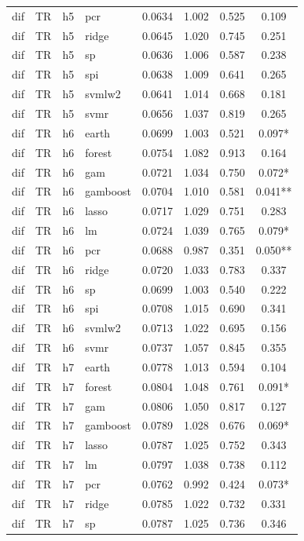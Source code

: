 \begin{ThreePartTable}
\begin{longtable}[t]{llclcccc}
dif & TR & h5 & pcr & 0.0634 & 1.002 & 0.525 & 0.109\\
dif & TR & h5 & ridge & 0.0645 & 1.020 & 0.745 & 0.251\\
dif & TR & h5 & sp & 0.0636 & 1.006 & 0.587 & 0.238\\
dif & TR & h5 & spi & 0.0638 & 1.009 & 0.641 & 0.265\\
dif & TR & h5 & svmlw2 & 0.0641 & 1.014 & 0.668 & 0.181\\
dif & TR & h5 & svmr & 0.0656 & 1.037 & 0.819 & 0.265\\
\addlinespace
dif & TR & h6 & earth & 0.0699 & 1.003 & 0.521 & 0.097*\\
dif & TR & h6 & forest & 0.0754 & 1.082 & 0.913 & 0.164\\
dif & TR & h6 & gam & 0.0721 & 1.034 & 0.750 & 0.072*\\
dif & TR & h6 & gamboost & 0.0704 & 1.010 & 0.581 & 0.041**\\
dif & TR & h6 & lasso & 0.0717 & 1.029 & 0.751 & 0.283\\
dif & TR & h6 & lm & 0.0724 & 1.039 & 0.765 & 0.079*\\
dif & TR & h6 & pcr & 0.0688 & 0.987 & 0.351 & 0.050**\\
dif & TR & h6 & ridge & 0.0720 & 1.033 & 0.783 & 0.337\\
dif & TR & h6 & sp & 0.0699 & 1.003 & 0.540 & 0.222\\
dif & TR & h6 & spi & 0.0708 & 1.015 & 0.690 & 0.341\\
dif & TR & h6 & svmlw2 & 0.0713 & 1.022 & 0.695 & 0.156\\
dif & TR & h6 & svmr & 0.0737 & 1.057 & 0.845 & 0.355\\
\addlinespace
dif & TR & h7 & earth & 0.0778 & 1.013 & 0.594 & 0.104\\
dif & TR & h7 & forest & 0.0804 & 1.048 & 0.761 & 0.091*\\
dif & TR & h7 & gam & 0.0806 & 1.050 & 0.817 & 0.127\\
dif & TR & h7 & gamboost & 0.0789 & 1.028 & 0.676 & 0.069*\\
dif & TR & h7 & lasso & 0.0787 & 1.025 & 0.752 & 0.343\\
dif & TR & h7 & lm & 0.0797 & 1.038 & 0.738 & 0.112\\
dif & TR & h7 & pcr & 0.0762 & 0.992 & 0.424 & 0.073*\\
dif & TR & h7 & ridge & 0.0785 & 1.022 & 0.732 & 0.331\\
dif & TR & h7 & sp & 0.0787 & 1.025 & 0.736 & 0.346\\

\end{longtable}
\end{ThreePartTable}

